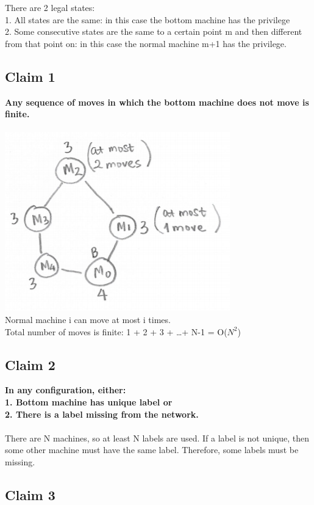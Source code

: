 \documentclass[twoside]{article}
\begin{document}
There are 2 legal states:\\
1.	All states are the same: in this case the bottom machine has the privilege\\
2.	Some consecutive states are the same to a certain point m and then different from that point on: in this case the normal machine m+1 has the privilege.

\subsection{Claim 1}
\textbf{Any sequence of moves in which the bottom machine does not move is finite.}\\\\
\includegraphics[scale=0.6]{claim1.PNG}\\
Normal machine i can move at most i times.\\
Total number of moves is finite: 1 + 2 + 3 + \ldots + N-1 = O(${N}^2$)\\


\subsection{Claim 2}

\textbf{In any configuration, either:\\
1.	Bottom machine has unique label or\\
2.	There is a label missing from the network.}\\\\
There are N machines, so at least N labels are used. If a label is not unique, then some other machine must have the same label. Therefore, some labels must be missing.\\

\subsection{Claim 3}
\end{document}
